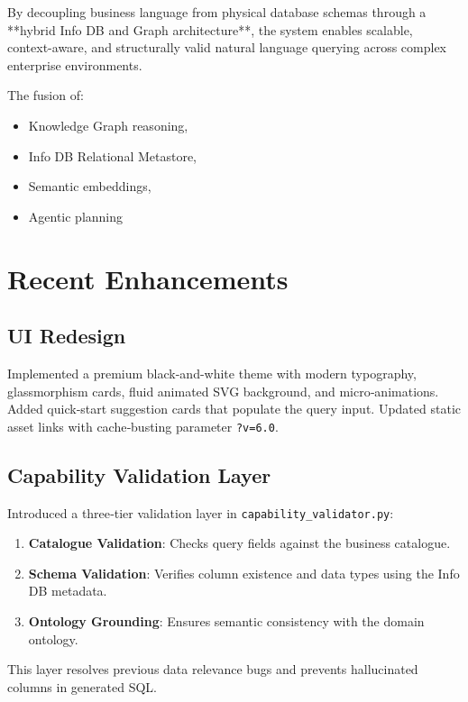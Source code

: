 \documentclass[11pt,a4paper]{article}
\begin{document}
By decoupling business language from physical database schemas through a **hybrid Info DB and Graph architecture**, the system enables scalable, context-aware, and structurally valid natural language querying across complex enterprise environments.

The fusion of:
\begin{itemize}
    \item Knowledge Graph reasoning,
    \item Info DB Relational Metastore,
    \item Semantic embeddings,
    \item Agentic planning
\end{itemize}

\section{Recent Enhancements}
\subsection{UI Redesign}
Implemented a premium black-and-white theme with modern typography, glassmorphism cards, fluid animated SVG background, and micro‑animations. Added quick‑start suggestion cards that populate the query input. Updated static asset links with cache‑busting parameter \texttt{?v=6.0}.

\subsection{Capability Validation Layer}
Introduced a three‑tier validation layer in \texttt{capability_validator.py}:
\begin{enumerate}
    \item \textbf{Catalogue Validation}: Checks query fields against the business catalogue.
    \item \textbf{Schema Validation}: Verifies column existence and data types using the Info DB metadata.
    \item \textbf{Ontology Grounding}: Ensures semantic consistency with the domain ontology.
\end{enumerate}
This layer resolves previous data relevance bugs and prevents hallucinated columns in generated SQL.
\end{document}
